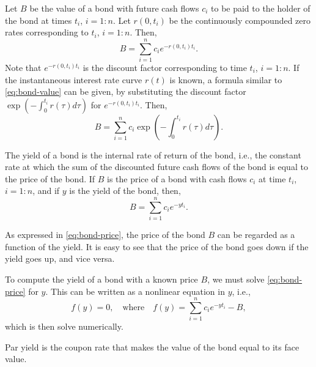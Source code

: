 Let $ B $ be the value of a bond with future cash flows $ c_i $ to be paid to
    the holder of the bond at times $ t_i $, $ i = 1 : n $.
Let $ r(0, t_i) $ be the continuously compounded zero rates corresponding to
    $ t_i $, $ i = 1 : n $.
Then,
\begin{equation}
    B = \sum_{i=1}^{n} c_i e^{-r(0, t_i)t_i}.
    \label{eq:bond-value}
\end{equation}
Note that $ e^{-r(0, t_i)t_i} $ is the discount factor corresponding to time
    $ t_i $, $ i = 1 : n $.
If the instantaneous interest rate curve $ r(t) $ is known, a formula similar
    to \eqref{eq:bond-value} can be given, by substituting the discount factor
    $ \exp \left( -\int_{0}^{t_i} r(\tau) d\tau \right) $ for
    $ e^{-r(0, t_i) t_i} $.
Then,
\begin{equation}
    B = \sum_{i=1}^{n} c_i \exp \left( -\int_{0}^{t_i} r(\tau) d\tau \right).
    \label{eq:bond-value-integral}
\end{equation}

\begin{definition}
    The yield of a bond is the internal rate of return of the bond, i.e., the
        constant rate at which the sum of the discounted future cash flows of
        the bond is equal to the price of the bond.
    If $ B $ is the price of a bond with cash flows $ c_i $ at time $ t_i $,
        $ i = 1 : n $, and if $ y $ is the yield of the bond, then,
    \begin{equation}
        B = \sum_{i=1}^{n} c_i e^{-yt_i}.
        \label{eq:bond-price}
    \end{equation}
\end{definition}

As expressed in \eqref{eq:bond-price}, the price of the bond $ B $ can be
    regarded as a function of the yield.
It is easy to see that the price of the bond goes down if the yield goes up, and
    vice versa.

To compute the yield of a bond with a known price $ B $, we must solve
    \eqref{eq:bond-price} for $ y $.
This can be written as a nonlinear equation in $ y $, i.e.,
\begin{equation*}
    f(y) = 0, \quad \text{where} \quad
    f(y) = \sum_{i=1}^{n} c_i e^{-y t_i} - B,
\end{equation*}
which is then solve numerically.

\begin{definition}
    Par yield is the coupon rate that makes the value of the bond equal to its
        face value.
\end{definition}

